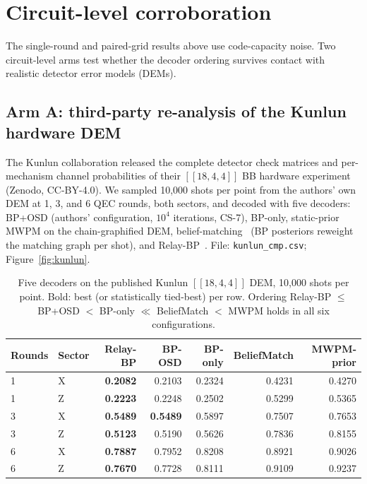 \documentclass[11pt,a4paper]{article}
\begin{document}
\section{Circuit-level corroboration}
\label{sec:circuit}

The single-round and paired-grid results above use code-capacity noise.
Two circuit-level arms test whether the decoder ordering survives contact
with realistic detector error models (DEMs).

\subsection{Arm A: third-party re-analysis of the Kunlun hardware DEM}

The Kunlun collaboration released the complete detector check matrices and
per-mechanism channel probabilities of their $[[18,4,4]]$ BB hardware
experiment~\cite{Wang2026kunlun} (Zenodo, CC-BY-4.0). We sampled
10{,}000 shots per point from the authors' own DEM at 1, 3, and 6 QEC
rounds, both sectors, and decoded with five decoders: BP+OSD (authors'
configuration, $10^4$ iterations, CS-7), BP-only, static-prior MWPM on the
chain-graphified DEM, belief-matching~\cite{Higgott2023belief} (BP
posteriors reweight the matching graph per shot), and
Relay-BP~\cite{Muller2025relay}. File: \texttt{kunlun\_cmp.csv};
Figure~\ref{fig:kunlun}.

\begin{table}[H]\centering\small
\caption{Five decoders on the published Kunlun $[[18,4,4]]$ DEM,
  10{,}000 shots per point. Bold: best (or statistically tied-best) per row.
  Ordering Relay-BP $\leq$ BP+OSD $<$ BP-only $\ll$ BeliefMatch $<$ MWPM holds
  in all six configurations.}
\label{tab:kunlun}
\begin{tabular}{@{}llrrrrr@{}}
\toprule
Rounds & Sector & Relay-BP & BP-OSD & BP-only & BeliefMatch & MWPM-prior \\\midrule
1 & X & \textbf{0.2082} & 0.2103 & 0.2324 & 0.4231 & 0.4270 \\
1 & Z & \textbf{0.2223} & 0.2248 & 0.2502 & 0.5299 & 0.5365 \\
3 & X & \textbf{0.5489} & \textbf{0.5489} & 0.5897 & 0.7507 & 0.7653 \\
3 & Z & \textbf{0.5123} & 0.5190 & 0.5626 & 0.7836 & 0.8155 \\
6 & X & \textbf{0.7887} & 0.7952 & 0.8208 & 0.8921 & 0.9026 \\
6 & Z & \textbf{0.7670} & 0.7728 & 0.8111 & 0.9109 & 0.9237 \\
\bottomrule
\end{tabular}
\end{table}
\end{document}
